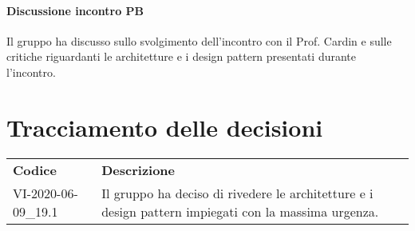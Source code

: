 \documentclass{article}
\begin{document}
\paragraph*{Discussione incontro PB}
Il gruppo ha discusso sullo svolgimento dell'incontro con il Prof. Cardin e sulle critiche riguardanti le architetture e i design pattern presentati durante l'incontro.

\section{Tracciamento delle decisioni}
\begin{table}[H]
  \centering
  \begin{tabular}{p{4cm}|p{12cm}}
    \rowcolor{lightgray}
    \textbf{Codice}  & \textbf{Descrizione}      \\
    VI-2020-06-09\_19.1 & Il gruppo ha deciso di rivedere le architetture e i design pattern impiegati con la massima urgenza. \\
  \end{tabular}
\end{table}
\end{document}
